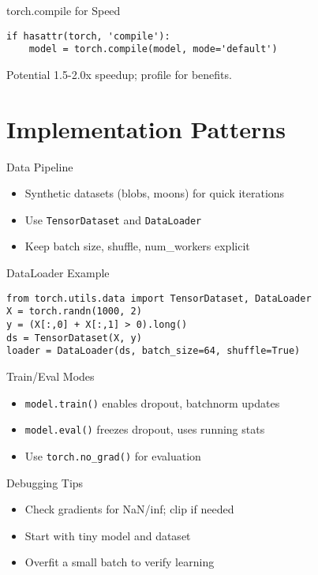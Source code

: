 \documentclass[aspectratio=169,10pt]{beamer}
\begin{document}
\begin{frame}[fragile]{torch.compile for Speed}
\begin{lstlisting}
if hasattr(torch, 'compile'):
    model = torch.compile(model, mode='default')
\end{lstlisting}
Potential 1.5-2.0x speedup; profile for benefits.
\end{frame}

\section{Implementation Patterns}

\begin{frame}{Data Pipeline}
\begin{itemize}
    \item Synthetic datasets (blobs, moons) for quick iterations
    \item Use \texttt{TensorDataset} and \texttt{DataLoader}
    \item Keep batch size, shuffle, num\_workers explicit
\end{itemize}
\end{frame}

\begin{frame}[fragile]{DataLoader Example}
\begin{lstlisting}
from torch.utils.data import TensorDataset, DataLoader
X = torch.randn(1000, 2)
y = (X[:,0] + X[:,1] > 0).long()
ds = TensorDataset(X, y)
loader = DataLoader(ds, batch_size=64, shuffle=True)
\end{lstlisting}
\end{frame}

\begin{frame}{Train/Eval Modes}
\begin{itemize}
    \item \texttt{model.train()} enables dropout, batchnorm updates
    \item \texttt{model.eval()} freezes dropout, uses running stats
    \item Use \texttt{torch.no\_grad()} for evaluation
\end{itemize}
\end{frame}

\begin{frame}{Debugging Tips}
\begin{itemize}
    \item Check gradients for NaN/inf; clip if needed
    \item Start with tiny model and dataset
    \item Overfit a small batch to verify learning
\end{itemize}
\end{frame}
\end{document}
